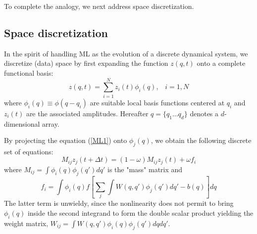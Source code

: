 \documentclass[15pt]{article}
\begin{document}
To complete the analogy, we next address space discretization.
  


\subsection{Space discretization}

In the spirit of handling ML as the evolution of a discrete dynamical system, we
discretize (data) space by first expanding the function $z(q,t)$ onto 
a complete functional basis:
\begin{equation}
z(q,t) = \sum_{i=1}^N z_i(t) \phi_i(q),\;\;\;i=1,N
\end{equation}
where $\phi_i(q) \equiv \phi(q-q_i)$ are suitable local basis functions
centered at $q_i$ and $z_i(t)$ are the associated amplitudes.
Hereafter $q=\lbrace q_1 \dots q_d \rbrace$ denotes a $d$-dimensional array.

By projecting the equation (\ref{ML1}) onto $\phi_j(q)$, we obtain
the following discrete set of equations:
\begin{equation}
\label{DISDYN}
M_{ij} z_j(t+\Delta t) = (1-\omega) M_{ij} z_j(t) + \omega f_i
\end{equation}
where $M_{ij} = \int \phi_i (q) \phi_j(q') dq'$ is the "mass"
matrix and 
\begin{equation}
\label{FI}
f_i = \int \phi_i(q) f[\sum_j \int W(q,q') \phi_j(q') dq' - b(q)]dq
\end{equation}
The latter term is unwieldy, since the nonlinearity does not permit to 
bring $\phi_i(q)$ inside the second integrand to form the double scalar product 
yielding the weight matrix, $W_{ij} = \int W(q,q') \phi_i(q) \phi_j(q') dq dq'$.
\end{document}

